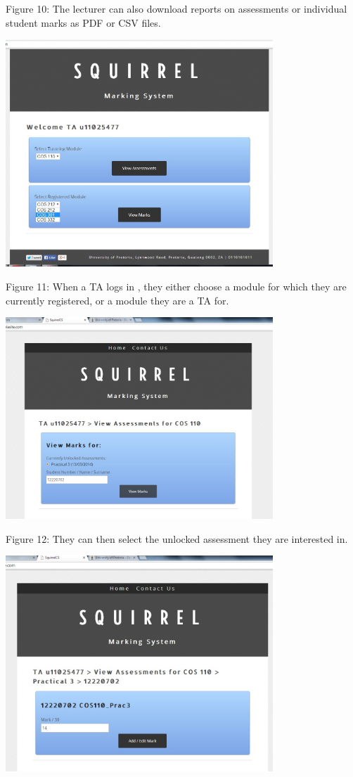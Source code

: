 \documentclass[a4paper]{article}
\begin{document}
\begin{center}
Figure 10: The lecturer can also download reports on assessments or individual student marks as PDF or CSV files.
\end{center}
\includegraphics[width=380px]{Images/WEBUITA_SelectModule.jpg}
\begin{center}
Figure 11: When a TA logs in , they either choose a module for which they are currently registered, or a module they are a TA for.
\end{center}
\includegraphics[width=380px]{Images/WEBUITA_ViewAssessments.jpg}
\begin{center}
Figure 12: They can then select the unlocked assessment they are interested in.
\end{center}
\includegraphics[width=380px]{Images/WEBUITA_ViewAddEditMarks.jpg}
\end{document}
